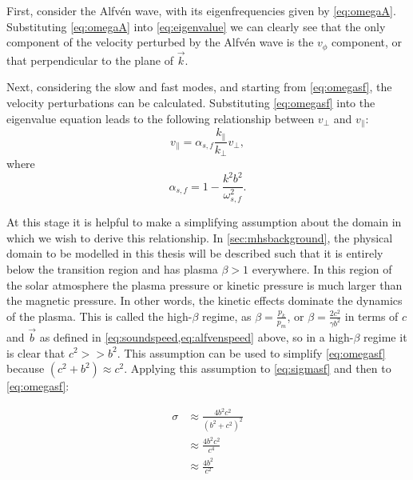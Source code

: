 First, consider the Alfv\'en wave, with its eigenfrequencies given by \cref{eq:omegaA}.
Substituting \cref{eq:omegaA} into \cref{eq:eigenvalue} we can clearly see that the only component of the velocity perturbed by the Alfv\'en wave is the $v_\phi$ component, or that perpendicular to the plane of $\vec{k}$.

Next, considering the slow and fast modes, and starting from \cref{eq:omegasf}, the velocity perturbations can be calculated.
Substituting \cref{eq:omegasf} into the eigenvalue equation leads to the following relationship between $v_\perp$ and $v_\parallel$:
\begin{equation}
    v_\parallel = \alpha_{s,f} \frac{k_\parallel}{k_\perp}v_\perp,
    \label{eq:vyvz}
\end{equation}
where
\begin{equation}
    \alpha_{s,f} = 1 - \frac{k^2b^2}{\omega^2_{s,f}}.
    \label{eq:alphasf}
\end{equation}

At this stage it is helpful to make a simplifying assumption about the domain in which we wish to derive this relationship.
In \cref{sec:mhsbackground}, the physical domain to be modelled in this thesis will be described such that it is entirely below the transition region and has plasma $\beta > 1$ everywhere.
In this region of the solar atmosphere the plasma pressure or kinetic pressure is much larger than the magnetic pressure.
In other words, the kinetic effects dominate the dynamics of the plasma.
This is called the high-$\beta$ regime, as $\displaystyle\beta = \frac{p_k}{p_m}$, or $\displaystyle\beta = \frac{2c^2}{\gamma b^2}$ in terms of $c$ and $\vec{b}$ as defined in \cref{eq:soundspeed,eq:alfvenspeed} above, so in a high-$\beta$ regime it is clear that $c^2 >> b^2$.
This assumption can be used to simplify \cref{eq:omegasf} because $(c^2 + b^2) \approx c^2$.
Applying this assumption to \cref{eq:sigmasf} and then to \cref{eq:omegasf}:

\begin{align}
    \sigma &\approx \frac{4b^2c^2}{(b^2+c^2)^2}\\
           &\approx \frac{4b^2c^2}{c^4}\\
           &\approx \frac{4b^2}{c^2}
\end{align}

